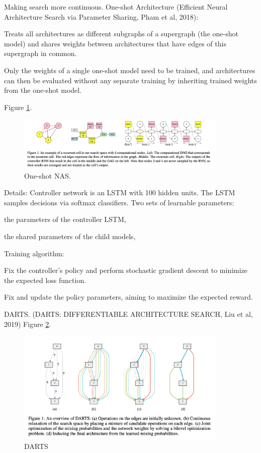 \documentclass[english]{article}
\begin{document}
\item Making search more continuous. One-shot Architecture (Efficient Neural Architecture Search via Parameter Sharing, Pham et al, 2018):

Treats all architectures as different subgraphs of a supergraph (the one-shot model) and shares weights between architectures that have edges of this supergraph in common.


Only the weights of a single one-shot model need to be trained, and architectures can then be evaluated without any separate training by inheriting trained weights from the one-shot model.

\item 
Figure \ref{nas10}.


\begin{figure}[h!]
  \centering
  \includegraphics[width=0.9\textwidth]{nas10.png}
  \caption{One-shot NAS.}
  \label{nas10}
\end{figure}

\item Details: 
Controller network is an LSTM with 100 hidden units. The LSTM samples decisions via softmax classifiers. Two sets of learnable parameters:
\benum 
\item 
 the parameters of the controller LSTM, 
 \item
  the shared parameters of the child models, 
\eenum 

Training algorithm: 
\benum 
\item 
Fix the controller's policy and perform stochastic gradient descent  to minimize the expected loss function.
 \item
Fix  and update the policy parameters, aiming to maximize the expected reward.
\eenum 



\eenum 


\item DARTS. (DARTS: DIFFERENTIABLE ARCHITECTURE SEARCH, Liu et al, 2019)
Figure \ref{darts}.


\begin{figure}[h!]
  \centering
  \includegraphics[width=0.9\textwidth]{DARTS}
  \caption{DARTS}
  \label{darts}
\end{figure}
\end{document}

